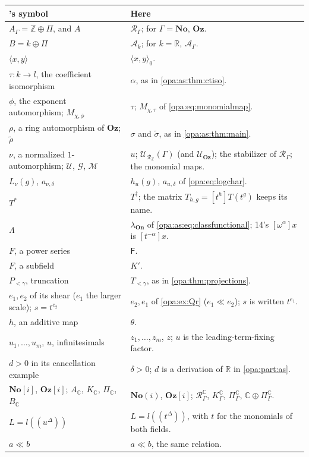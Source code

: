 \documentclass[11pt,oneside]{article}
\numberwithin{equation}{section}
\theoremstyle{definition}
\theoremstyle{remark}
\newcommand{\No}{\mathbf{No}}
\newcommand{\Oz}{\mathbf{Oz}}
\newcommand{\Og}{\mathbf{Oz}[i]}
\newcommand{\SC}{\mathbf{No}(i)}
\newcommand{\R}{\mathbb R}
\newcommand{\C}{\mathbb C}
\newcommand{\Z}{\mathbb Z}
\newcommand{\Ak}{\mathcal A_k}
\newcommand{\UU}{\mathcal U}
\newcommand{\bb}{\mathbin{\ll}}
\newcommand{\Hahn}[2]{#1((t^{#2}))}
\newcommand{\coef}[2]{[t^{#1}]#2}
\newcommand{\pairing}[2]{\langle #1,#2\rangle_0}
\newcommand{\On}{\mathbf{On}}
\begin{document}
\begin{center}
\renewcommand{\arraystretch}{1.15}
\begin{longtable}{>{\raggedright\arraybackslash}p{}>{\raggedright\arraybackslash}p{}}
\toprule
14's symbol & Here\\
\midrule
\endhead
$A_\Gamma=\Z\oplus\Pi$, and $A$ & $\mathcal R_\Gamma$; for $\Gamma=\No$, $\Oz$.\\
$B=k\oplus\Pi$ & $\Ak$; for $k=\R$, $\mathcal A_\Gamma$.\\
$\langle x,y\rangle$ & $\pairing xy$.\\
$\tau:k\to l$, the coefficient isomorphism & $\alpha$, as in \cref{opa:as:thm:ctiso}.\\
$\phi$, the exponent automorphism; $M_{\chi,\phi}$ & $\tau$; $M_{\chi,\tau}$ of \eqref{opa:eq:monomialmap}.\\
$\rho$, a ring automorphism of $\Oz$; $\widetilde\rho$ & $\sigma$ and $\widetilde\sigma$, as in \cref{opa:as:thm:main}.\\
$\nu$, a normalized $1$-automorphism; $\mathcal U$, $\mathcal G$, $\mathcal M$ & $u$; $\UU_{\mathcal R_\Z}(\Gamma)$
(and $\UU_\Oz$); the stabilizer of $\mathcal R_\Gamma$; the monomial maps.\\
$L_\nu(g)$, $a_{\nu,\delta}$ & $h_u(g)$, $a_{u,\delta}$ of \eqref{opa:eq:logchar}.\\
$T^*$ & $T^\dagger$; the matrix $T_{h,g}=\coef h{T(t^g)}$ keeps its name.\\
$\Lambda$ & $\lambda_{\On}$ of \eqref{opa:as:eq:classfunctional}; 14's $[\omega^\alpha]x$ is $\coef{-\alpha}x$.\\
$F$, a power series & $\mathsf F$.\\
$F$, a subfield & $K'$.\\
$P_{<\gamma}$, truncation & $T_{<\gamma}$, as in \cref{opa:thm:projections}.\\
$e_1,e_2$ of its shear ($e_1$ the larger scale); $s=t^{e_2}$ & $e_2,e_1$ of \cref{opa:ex:Qr} ($e_1\bb e_2$);
$s$ is written $t^{e_1}$.\\
$h$, an additive map & $\theta$.\\
$u_1,\dots,u_m$, $u$, infinitesimals & $z_1,\dots,z_m$, $z$; $u$ is the leading-term-fixing factor.\\
$d>0$ in its cancellation example & $\delta>0$; $d$ is a derivation of $\R$ in \cref{opa:part:as}.\\
$\mathbf{No}[i]$, $\mathbf{Oz}[i]$; $A_\C$, $K_\C$, $\Pi_\C$, $B_\C$ & $\SC$, $\Og$;
$\mathcal R^\C_\Gamma$, $K^\C_\Gamma$, $\Pi^\C_\Gamma$, $\C\oplus\Pi^\C_\Gamma$.\\
$L=l((u^\Delta))$ & $L=\Hahn l\Delta$, with $t$ for the monomials of both fields.\\
$a\ll b$ & $a\bb b$, the same relation.\\
\bottomrule
\end{longtable}
\end{center}
\end{document}
